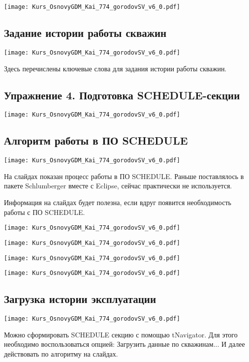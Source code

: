 \documentclass[main.tex]{subfiles}
\begin{document}
\texttt{[image: Kurs\_OsnovyGDM\_Kai\_774\_gorodovSV\_v6\_0.pdf]}

\subsection{Задание истории работы скважин}

\texttt{[image: Kurs\_OsnovyGDM\_Kai\_774\_gorodovSV\_v6\_0.pdf]}

Здесь перечислены ключевые слова для задания истории работы скважин.

\subsection{Упражнение 4. Подготовка SCHEDULE-секции}

\texttt{[image: Kurs\_OsnovyGDM\_Kai\_774\_gorodovSV\_v6\_0.pdf]}

\subsection{Алгоритм работы в ПО SCHEDULE}

\texttt{[image: Kurs\_OsnovyGDM\_Kai\_774\_gorodovSV\_v6\_0.pdf]}

На слайдах показан процесс работы в ПО SCHEDULE.
Раньше поставлялось в пакете Schlumberger вместе с Eclipse, сейчас практически не используется.

Информация на слайдах будет полезна, если вдруг появится необходимость работы с ПО SCHEDULE.

\texttt{[image: Kurs\_OsnovyGDM\_Kai\_774\_gorodovSV\_v6\_0.pdf]}

\texttt{[image: Kurs\_OsnovyGDM\_Kai\_774\_gorodovSV\_v6\_0.pdf]}

\texttt{[image: Kurs\_OsnovyGDM\_Kai\_774\_gorodovSV\_v6\_0.pdf]}

\texttt{[image: Kurs\_OsnovyGDM\_Kai\_774\_gorodovSV\_v6\_0.pdf]}

\subsection{Загрузка истории эксплуатации}

\texttt{[image: Kurs\_OsnovyGDM\_Kai\_774\_gorodovSV\_v6\_0.pdf]}

Можно сформировать SCHEDULE секцию с помощью tNavigator.
Для этого необходимо воспользоваться опцией: Загрузить данные по скважинам...
И далее действовать по алгоритму на слайдах.
\end{document}
